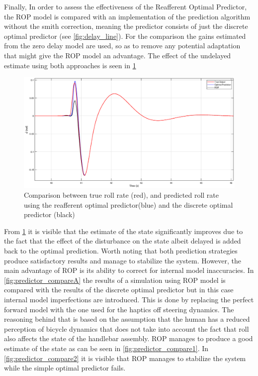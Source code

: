 Finally, In order to assess the effectiveness of the Reafferent Optimal Predictor, the ROP model is compared with an implementation of the prediction algorithm without the smith correction, meaning the predictor consists of just the discrete optimal predictor (see \cref{fig:delay_line}). For the comparison the gains estimated from the zero delay model are used, so as to remove any potential adaptation that might give the ROP model an advantage. The effect of the undelayed estimate using both approaches is seen in \cref{fig:predictor_compare}
\begin{figure}[!h]
    \centering
    \captionsetup{justification=centering,margin=2cm}

    \includegraphics[width=\textwidth]{images/predictor_plots/rate_compare.eps}
    \caption{Comparison between true roll rate (red), and predicted roll rate using the reafferent optimal predictor(blue) and the discrete optimal predictor (black)}
    \label{fig:predictor_compare}
\end{figure}

From \cref{fig:predictor_compare} it is visible that the estimate of the state significantly improves due to the fact that the effect of the disturbance on the state albeit delayed is added back to the optimal prediction. Worth noting that both prediction strategies produce satisfactory results and manage to stabilize the system. However, the main advantage of  ROP is its ability to correct for internal model inaccuracies. In \cref{fig:predictor_compareA} the results of a simulation using ROP  model is compared with the results of the discrete optimal predictor but in this case internal model imperfections are introduced. This is done by replacing the perfect forward model with  the one used for the haptics off steering dynamics. The reasoning behind that is based on the assumption that the human has a reduced perception of bicycle dynamics that does not take into account the fact that roll also affects the state of the handlebar assembly. ROP manages to produce a good estimate of the state as can be seen in \cref{fig:predictor_compare1}. In \cref{fig:predictor_compare2} it is visible that ROP manages to stabilize the system while the simple optimal predictor fails.


